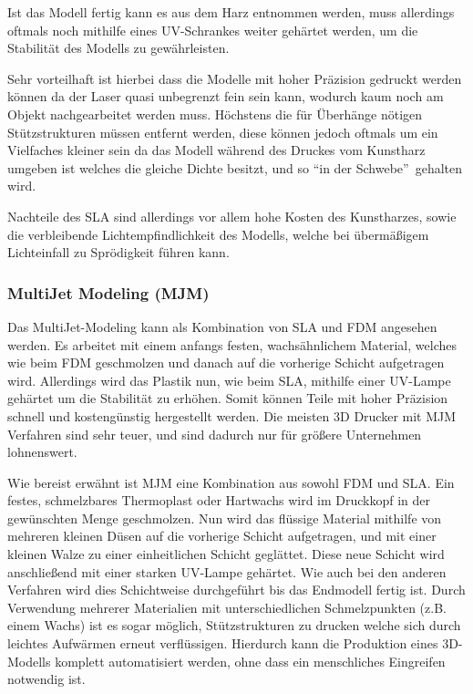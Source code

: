 Ist das Modell fertig kann es aus dem Harz entnommen werden, muss allerdings oftmals noch mithilfe eines UV-Schrankes weiter gehärtet werden, um die Stabilität des Modells zu gewährleisten.

Sehr vorteilhaft ist hierbei dass die Modelle mit hoher Präzision gedruckt werden können da der Laser quasi unbegrenzt fein sein kann, wodurch kaum noch am Objekt nachgearbeitet werden muss. Höchstens die für Überhänge nötigen Stützstrukturen müssen entfernt werden, diese können jedoch oftmals um ein Vielfaches kleiner sein da das Modell während des Druckes vom Kunstharz umgeben ist welches die gleiche Dichte besitzt, und so \textquotedblleft in der Schwebe\textquotedblright ~gehalten wird.

Nachteile des SLA sind allerdings vor allem hohe Kosten des Kunstharzes, sowie die verbleibende Lichtempfindlichkeit des Modells, welche bei übermäßigem Lichteinfall zu Sprödigkeit führen kann. \parencite[Informationen aus:][]{DRUCKVERFAHREN}

\subsubsection{MultiJet Modeling (MJM)}

Das MultiJet-Modeling kann als Kombination von SLA und FDM angesehen werden. Es arbeitet mit einem anfangs festen, wachsähnlichem Material, welches wie beim FDM geschmolzen und danach auf die vorherige Schicht aufgetragen wird. Allerdings wird das Plastik nun, wie beim SLA, mithilfe einer UV-Lampe gehärtet um die Stabilität zu erhöhen. Somit können Teile mit hoher Präzision schnell und kostengünstig hergestellt werden. Die meisten 3D Drucker mit MJM Verfahren sind sehr teuer, und sind dadurch nur für größere Unternehmen lohnenswert.

Wie bereist erwähnt ist MJM eine Kombination aus sowohl FDM und SLA. Ein festes, schmelzbares Thermoplast oder Hartwachs wird im Druckkopf in der gewünschten Menge geschmolzen. Nun wird das flüssige Material mithilfe von mehreren kleinen Düsen auf die vorherige Schicht aufgetragen, und mit einer kleinen Walze zu einer einheitlichen Schicht geglättet. Diese neue Schicht wird anschließend mit einer starken UV-Lampe gehärtet. Wie auch bei den anderen Verfahren wird dies Schichtweise durchgeführt bis das Endmodell fertig ist. Durch Verwendung mehrerer Materialien mit unterschiedlichen Schmelzpunkten (z.B. einem Wachs) ist es sogar möglich, Stützstrukturen zu drucken welche sich durch leichtes Aufwärmen erneut verflüssigen. Hierdurch kann die Produktion eines 3D-Modells komplett automatisiert werden, ohne dass ein menschliches Eingreifen notwendig ist.

